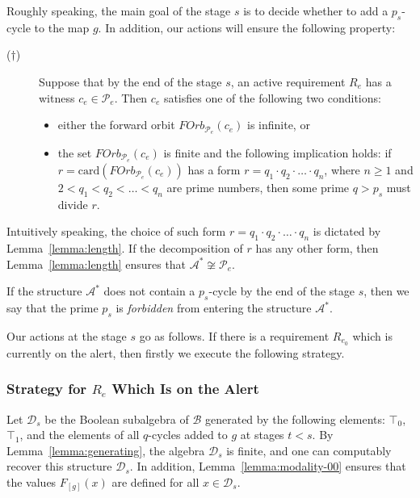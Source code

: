 \documentclass[a4paper,UKenglish,cleveref, autoref, thm-restate]{lipics-v2021}
\begin{document}
 Roughly speaking, the main goal of the stage $s$ is to decide whether to add a $p_{s}$-cycle to the map $g$. 
In addition, our actions will ensure the following property:
\begin{description} 
	\item[($\dagger$)] Suppose that by the end of the stage $s$, an active requirement $R_e$ has a witness $c_e\in \mathcal{P}_e$. Then $c_e$ satisfies one of the following two conditions:
	\begin{itemize}
		\item either the forward orbit $FOrb_{\mathcal{P}_e}(c_e)$ is infinite, or
		
		\item the set $FOrb_{\mathcal{P}_e}(c_e)$ is finite and the following implication holds:
		if $r = \mathrm{card}(FOrb_{\mathcal{P}_e}(c_e))$ has a form $r = q_1 \cdot q_2 \cdot \ldots \cdot q_n$, where $n\geq 1$ and $2 < q_1 <q_2 <\dots < q_n$ are prime numbers, then some prime $q > p_s$ must divide $r$.
	\end{itemize}
\end{description}
Intuitively speaking, the choice of such form $r = q_1 \cdot q_2 \cdot \ldots \cdot q_n$ is dictated by Lemma~\ref{lemma:length}. If the decomposition of $r$ has any other form, then Lemma~\ref{lemma:length} ensures that $\mathcal{A}^{\ast} \not\cong \mathcal{P}_e$.


If the structure $\mathcal{A}^{\ast}$ does not contain a $p_{s}$-cycle by the end of the stage $s$, then we say that the prime $p_s$ is \emph{forbidden} from entering the structure $\mathcal{A}^{\ast}$.



Our actions at the stage $s$ go as follows. If there is a requirement $R_{e_0}$ which is currently on the alert, then firstly we execute the following strategy.


\subsubsection{Strategy for $R_e$ Which Is on the Alert}

Let $\mathcal{D}_s$ be the Boolean subalgebra of $\mathcal{B}$ generated by the following elements: $\top_0$, $\top_1$, and the elements of all $q$-cycles added to $g$ at stages $t < s$. By Lemma~\ref{lemma:generating}, the algebra $\mathcal{D}_s$ is finite, and one can computably recover this structure $\mathcal{D}_s$. In addition, Lemma~\ref{lemma:modality-00} ensures that the values $F_{[g]}(x)$ are defined for all $x\in \mathcal{D}_s$.
\end{document}
